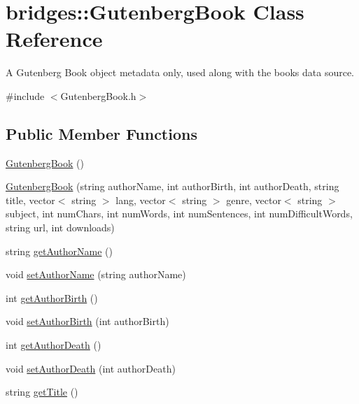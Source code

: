\hypertarget{classbridges_1_1_gutenberg_book}{}\section{bridges\+:\+:Gutenberg\+Book Class Reference}
\label{classbridges_1_1_gutenberg_book}


A Gutenberg Book object metadata only, used along with the books data source.  




{\ttfamily \#include $<$Gutenberg\+Book.\+h$>$}

\subsection*{Public Member Functions}
\begin{DoxyCompactItemize}
\item 
\hyperlink{classbridges_1_1_gutenberg_book_a289c167dd11eed17cce39a59931f246c}{Gutenberg\+Book} ()
\item 
\hyperlink{classbridges_1_1_gutenberg_book_ab792768f0f2567835e90659f163f4438}{Gutenberg\+Book} (string author\+Name, int author\+Birth, int author\+Death, string title, vector$<$ string $>$ lang, vector$<$ string $>$ genre, vector$<$ string $>$ subject, int num\+Chars, int num\+Words, int num\+Sentences, int num\+Difficult\+Words, string url, int downloads)
\item 
string \hyperlink{classbridges_1_1_gutenberg_book_aa323f15acc05fd74bb59cd3c182ca686}{get\+Author\+Name} ()
\item 
void \hyperlink{classbridges_1_1_gutenberg_book_ab7b3a1d3398b75100b8d3fb7936b3ac9}{set\+Author\+Name} (string author\+Name)
\item 
int \hyperlink{classbridges_1_1_gutenberg_book_a86f4ea70ec32fd1cce772910b9dcc9a6}{get\+Author\+Birth} ()
\item 
void \hyperlink{classbridges_1_1_gutenberg_book_a33ac2e6063319064006fa72b6fcfb0dc}{set\+Author\+Birth} (int author\+Birth)
\item 
int \hyperlink{classbridges_1_1_gutenberg_book_a82ae9b4815b25f8e7b337f143f1cf828}{get\+Author\+Death} ()
\item 
void \hyperlink{classbridges_1_1_gutenberg_book_acf1e81a3b635fb939bc6af772a61fd3c}{set\+Author\+Death} (int author\+Death)
\item 
string \hyperlink{classbridges_1_1_gutenberg_book_a1ef4a40396485a78480f99ca3b490db0}{get\+Title} ()
\item 

\end{DoxyCompactItemize}
